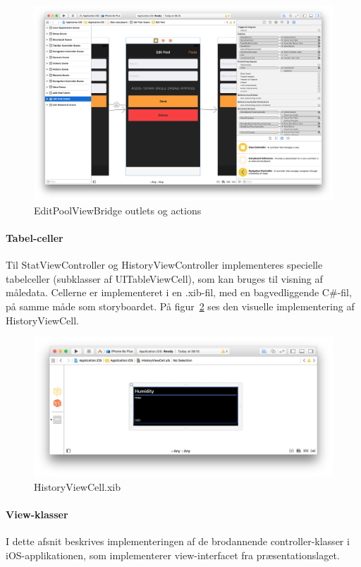 \begin{figure}
	\centering
	\includegraphics[width=1.0\linewidth]{figs/implementering/ios_imp_actionsoutlets}
	\caption{EditPoolViewBridge outlets og actions}
	\label{fig:ios_imp_actionsoutlets}
\end{figure}

\paragraph{Tabel-celler}
Til StatViewController og HistoryViewController implementeres specielle tabelceller (subklasser af UITableViewCell), som kan bruges til visning af måledata. Cellerne er implementeret i en .xib-fil, med en bagvedliggende C\#-fil, på samme måde som storyboardet. På figur~\ref{fig:ios_imp_historycell} ses den visuelle implementering af HistoryViewCell.

\begin{figure}
	\centering
	\includegraphics[width=0.8\linewidth]{figs/implementering/ios_imp_historycell}
	\caption{HistoryViewCell.xib}
	\label{fig:ios_imp_historycell}
\end{figure}

\paragraph{View-klasser}
I dette afsnit beskrives implementeringen af de brodannende controller-klasser i iOS-applikationen, som implementerer view-interfacet fra præsentationslaget.

